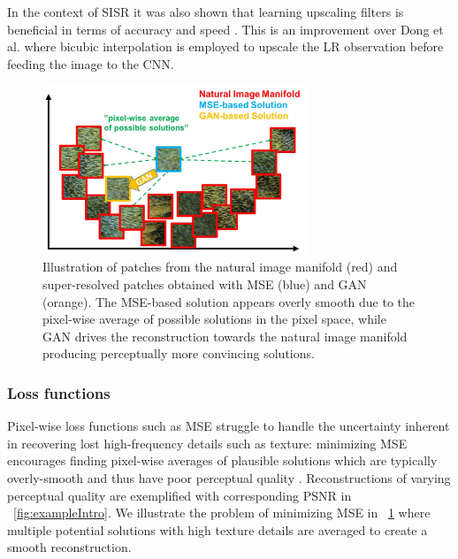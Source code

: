 \documentclass[10pt,twocolumn,letterpaper]{article}
\begin{document}
	In the context of \ac{SISR} it was also shown that learning upscaling filters is beneficial in terms of accuracy and speed \cite{dong2016accelerating,Shi2016ESPCN,Wang2016}.
	This is an improvement over Dong et al. \cite{dong2016image} where bicubic interpolation is employed to upscale the LR observation before feeding the image to the \ac{CNN}. %

\begin{figure}[ht] 
     	\includegraphics[trim=0 0 0 0, clip, width=3.1in]{images/used/jpg/manifold.jpg} 
	\caption{Illustration of patches from the natural image manifold (red) and super-resolved patches obtained with MSE (blue) and GAN (orange). The MSE-based solution appears overly smooth due to the pixel-wise average of possible solutions in the pixel space, while GAN drives the reconstruction towards the natural image manifold producing perceptually more convincing solutions.} 
	\label{fig:manifold}
\end{figure}

\subsubsection{Loss functions}
Pixel-wise loss functions such as \ac{MSE} struggle to handle the uncertainty inherent in recovering lost high-frequency details such as texture: minimizing \ac{MSE} encourages finding pixel-wise averages of plausible solutions which are typically overly-smooth and thus have poor perceptual quality \cite{Mathieu2015, Johnson16PercepLoss, dosovitskiy2016generating, bruna2016super}. 
	 Reconstructions of varying perceptual quality are exemplified with corresponding \ac{PSNR} in \figurename~\ref{fig:exampleIntro}. We illustrate the problem of minimizing \ac{MSE} in \figurename~\ref{fig:manifold} where multiple potential solutions with high texture details are averaged to create a smooth reconstruction.
\end{document}
